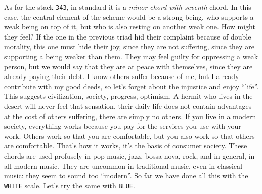 \documentclass[]{report}
\begin{document}
As for the stack \texttt{343}, in standard it is a \emph{minor chord with seventh} chord. In this case, the central element of the scheme would be a strong being, who supports a weak being on top of it, but who is also resting on another weak one. How might they feel? If the one in the previous triad hid their complaint because of double morality, this one must hide their joy, since they are not suffering, since they are supporting a being weaker than them. They may feel guilty for oppressing a weak person, but we would say that they are at peace with themselves, since they are already paying their debt. I know others suffer because of me, but I already contribute with my good deeds, so let's forget about the injustice and enjoy ``life''. This suggests civilization, society, progress, optimism. A hermit who lives in the desert will never feel that sensation, their daily life does not contain advantages at the cost of others suffering, there are simply no others. If you live in a modern society, everything works because you pay for the services you use with your work. Others work so that you are comfortable, but you also work so that others are comfortable. That's how it works, it's the basis of consumer society. These chords are used profusely in pop music, jazz, bossa nova, rock, and in general, in all modern music. They are uncommon in traditional music, even in classical music: they seem to sound too ``modern''.
So far we have done all this with the \texttt{WHITE} scale. Let's try the same with \texttt{BLUE}.
\begin{table}[H]
  \centering
  \caption{Particles  of 1 note}\label{tab:particles-one-note-blue}
\end{table}
\vspace{-2em} %
\begin{table}[H]
  \centering
  \caption{Particles  of 2 notes}\label{tab:particles-two-notes-blue}
\end{table}
\end{document}
